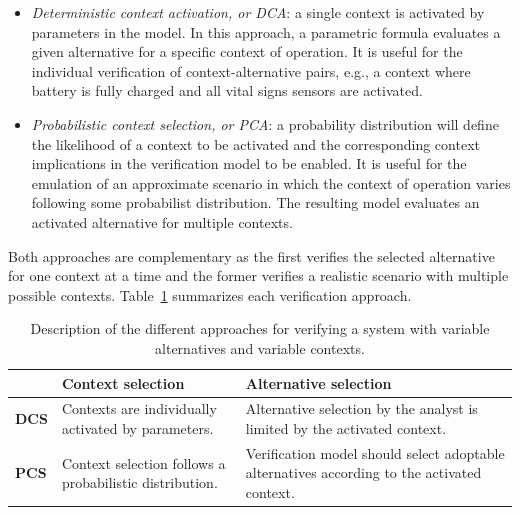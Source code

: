 \begin{itemize}

\item \textit{Deterministic context activation, or DCA}: a single context is activated by parameters in the model. In this approach, a parametric formula evaluates a given alternative for a specific context of operation. It is useful for the individual verification of context-alternative pairs, e.g., a context where battery is fully charged and all vital signs sensors are activated.
\medskip

\item \textit{Probabilistic context selection, or PCA}: a probability distribution will define the likelihood of a context to be activated and the corresponding context implications in the verification model to be enabled. It is useful for the emulation of an approximate scenario in which the context of operation varies following some probabilist distribution. The resulting model evaluates an activated alternative for multiple contexts. 

\end{itemize}

Both approaches are complementary as the first verifies the selected alternative for one context at a time and the former verifies a realistic scenario with multiple possible contexts. Table~\ref{tab:SC_DCA_PCA} summarizes each verification approach.

\begin{table}[h]
{\renewcommand{\arraystretch}{2.5}
\begin{tabularx}{\textwidth}{@{}l|XX@{}}
\toprule
			 &                                                         \textbf{Context selection}			 &                                                                                                      \textbf{Alternative selection}			\\ \midrule
\textbf{DCS} & Contexts are individually activated by parameters.  & Alternative selection by the analyst is limited by the activated context.                                                                                    \\
\textbf{PCS} & Context selection follows a probabilistic distribution. & Verification model should select adoptable alternatives according to the activated context.\\ \bottomrule
\end{tabularx}
}
\caption{Description of the different approaches for verifying a system with variable alternatives and variable contexts.}
\label{tab:SC_DCA_PCA}
\end{table}

